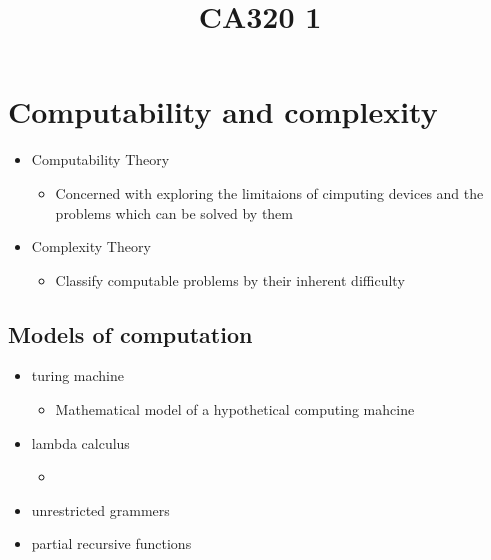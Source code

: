 \documentclass{article}
\title{CA320 1}
\begin{document}
    \maketitle

    \section{Computability and complexity}
    \begin{itemize}
        \item{Computability Theory}
            \begin{itemize}
                \item{Concerned with exploring the limitaions of cimputing devices and the problems which can be solved by them}
            \end{itemize}

        \item{Complexity Theory}
            \begin{itemize}
                \item{Classify computable problems by their inherent difficulty}
            \end{itemize}
    \end{itemize}

    \subsection{Models of computation}
    \begin{itemize}
        \item{turing machine}
            \begin{itemize}
                \item{Mathematical model of a hypothetical computing mahcine}
            \end{itemize}
        \item{lambda calculus}
            \begin{itemize}
                \item{}
            \end{itemize}
        \item{unrestricted grammers}
        \item{partial recursive functions}
    \end{itemize}
\end{document}
